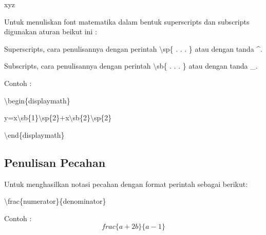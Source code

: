 xyz
\par \vspace{12pt}
Untuk menuliskan font matematika dalam bentuk superscripts dan 
subscripts digunakan aturan beikut ini :\par \vspace{12pt}

Superscripts, cara penulisannya dengan perintah $\setminus$sp\{ . . . 
\} atau dengan tanda \^{}.
\par \vspace{12pt}
Subscripts, cara penulisannya dengan perintah $\setminus$sb\{ . . . \} 
atau dengan tanda \_.
\par \vspace{12pt}
Contoh :
\par \vspace{12pt}
$\setminus$begin\{displaymath\}
\par \vspace{12pt}

y=x$\setminus$sb\{1\}$\setminus$sp\{2\}+x$\setminus$sb\{2\}$\setminus$sp\{2\}
\par \vspace{12pt}
$\setminus$end\{displaymath\}
\par \vspace{12pt}


\subsection {Penulisan Pecahan}
\par \vspace{12pt}
Untuk menghasilkan notasi pecahan dengan format perintah sebagai berikut:\par \vspace{12pt}

$\setminus$frac\{numerator\}\{denominator\}
\par \vspace{12pt}
Contoh :
\begin{equation}
frac\{a+2b\}\{a-1\}
\end{equation}


